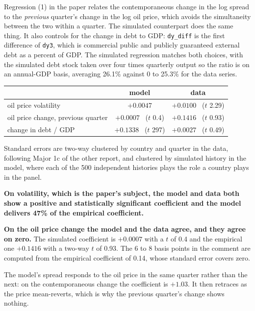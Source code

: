 Regression (1) in the paper relates the contemporaneous change in the log spread
to the \emph{previous} quarter's change in the log oil price, which avoids the
simultaneity between the two within a quarter. The simulated counterpart does
the same thing. It also controls for the change in debt to GDP:
\texttt{dy\_diff} is the first difference of \texttt{dy3}, which is commercial
public and publicly guaranteed external debt as a percent of GDP. The simulated
regression matches both choices, with the simulated debt stock taken over four
times quarterly output so the ratio is on an annual-GDP basis, averaging 26.1\%
against 0 to 25.3\% for the data series.

\begin{table}[h]
\centering\footnotesize
\begin{tabular}{lcc}
\toprule
 & model & data \\
\midrule
oil price volatility               & $+0.0047$ & $+0.0100$ \ ($t$ 2.29) \\
oil price change, previous quarter & $+0.0007$ \ ($t$ 0.4) & $+0.1416$ \ ($t$ 0.93) \\
change in debt / GDP               & $+0.1338$ \ ($t$ 297) & $+0.0027$ \ ($t$ 0.49) \\
\bottomrule
\end{tabular}
\end{table}

Standard errors are two-way clustered by country and quarter in the data,
following Major 1c of the other report, and clustered by simulated history in
the model, where each of the 500 independent histories plays the role a country
plays in the panel.

\textbf{On volatility, which is the paper's subject, the model and data both
show a positive and statistically significant coefficient and the model delivers
47\% of the empirical coefficient.}

\textbf{On the oil price change the model and the data agree, and they agree on
zero.} The simulated coefficient is $+0.0007$ with a $t$ of 0.4 and the
empirical one $+0.1416$ with a two-way $t$ of 0.93. The 6 to 8 basis points in
the comment are computed from the empirical coefficient of 0.14, whose standard
error covers zero.

The model's spread responds to the oil price in the same quarter rather than the
next: on the contemporaneous change the coefficient is $+1.03$. It then retraces
as the price mean-reverts, which is why the previous quarter's change shows
nothing.

